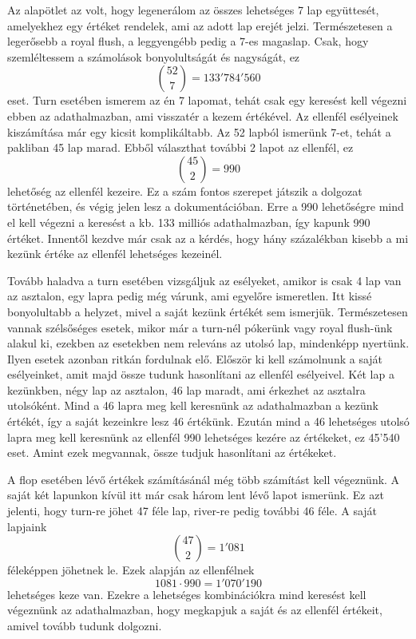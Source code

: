 Az alapötlet az volt, hogy legenerálom az összes lehetséges 7 lap együttesét, amelyekhez egy értéket rendelek, ami az adott lap erejét jelzi. Természetesen a legerősebb a royal flush, a leggyengébb pedig a 7-es magaslap. Csak, hogy szemléltessem a számolások bonyolultságát és nagyságát, ez \[ \binom{52}{7}=133'784'560\] eset. Turn esetében ismerem az én 7 lapomat, tehát csak egy keresést kell végezni ebben az adathalmazban, ami visszatér a kezem értékével. Az ellenfél esélyeinek kiszámítása már egy kicsit komplikáltabb. Az 52 lapból ismerünk 7-et, tehát a pakliban 45 lap marad. Ebből választhat további 2 lapot az ellenfél, ez \[ \binom{45}{2}=990\] lehetőség az ellenfél kezeire. Ez a szám fontos szerepet játszik a dolgozat történetében, és végig jelen lesz a dokumentációban. Erre a 990 lehetőségre mind el kell végezni a keresést a kb. 133 milliós adathalmazban, így kapunk 990 értéket. Innentől kezdve már csak az a kérdés, hogy hány százalékban kisebb a mi kezünk értéke az ellenfél lehetséges kezeinél. 

Tovább haladva a turn esetében vizsgáljuk az esélyeket, amikor is csak 4 lap van az asztalon, egy lapra pedig még várunk, ami egyelőre ismeretlen. Itt kissé bonyolultabb a helyzet, mivel a saját kezünk értékét sem ismerjük. Természetesen vannak szélsőséges esetek, mikor már a turn-nél pókerünk vagy royal flush-ünk alakul ki, ezekben az esetekben nem releváns az utolsó lap, mindenképp nyertünk. Ilyen esetek azonban ritkán fordulnak elő. Először ki kell számolnunk a saját esélyeinket, amit majd össze tudunk hasonlítani az ellenfél esélyeivel. Két lap a kezünkben, négy lap az asztalon, 46 lap maradt, ami érkezhet az asztalra utolsóként. Mind a 46 lapra meg kell keresnünk az adathalmazban a kezünk értékét, így a saját kezeinkre lesz 46 értékünk. Ezután mind a 46 lehetséges utolsó lapra meg kell keresnünk az ellenfél 990 lehetséges kezére az értékeket, ez 45'540 eset. Amint ezek megvannak, össze tudjuk hasonlítani az értékeket.

A flop esetében lévő értékek számításánál még több számítást kell végeznünk. A saját két lapunkon kívül itt már csak három lent lévő lapot ismerünk. Ez azt jelenti, hogy turn-re jöhet 47 féle lap, river-re pedig további 46 féle. A saját lapjaink \[ \binom{47}{2}=1'081\] féleképpen jöhetnek le. Ezek alapján az ellenfélnek \[1081\cdot990=1'070'190\] lehetséges keze van. Ezekre a lehetséges kombinációkra mind keresést kell végeznünk az adathalmazban, hogy megkapjuk a saját és az ellenfél értékeit, amivel tovább tudunk dolgozni.

